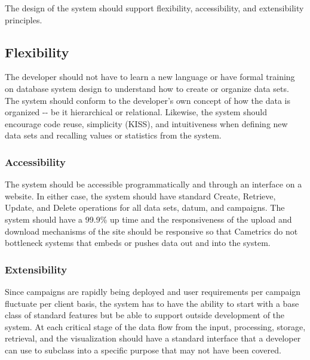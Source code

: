 \documentclass[10pt,a4paper,english]{article}
\begin{document}
The design of the system should support flexibility, accessibility, and extensibility principles.



\hypertarget{flexibility}{}
\subsection*{Flexibility}
\label{flexibility}

The developer should not have to learn a new language or have formal training on database system design to understand how to create or organize data sets. The system should conform to the developer's own concept of how the data is organized -{}- be it hierarchical or relational. Likewise, the system should encourage code reuse, simplicity (KISS), and intuitiveness when defining new data sets and recalling values or statistics from the system.



\hypertarget{accessibility}{}
\subsubsection*{Accessibility}
\label{accessibility}

The system should be accessible programmatically and through an interface on a website. In either case, the system should have standard Create, Retrieve, Update, and Delete operations for all data sets, datum, and campaigns. The system should have a 99.9{\%} up time and the responsiveness of the upload and download mechanisms of the site should be responsive so that Cametrics do not bottleneck systems that embeds or pushes data out and into the system.



\hypertarget{extensibility}{}
\subsubsection*{Extensibility}
\label{extensibility}

Since campaigns are rapidly being deployed and user requirements per campaign fluctuate per client basis, the system has to have the ability to start with a base class of standard features but be able to support outside development of the system. At each critical stage of the data flow from the input, processing, storage, retrieval, and the visualization should have a standard interface that a developer can use to subclass into a specific purpose that may not have been covered.
\end{document}
